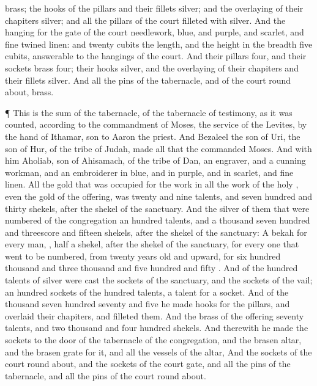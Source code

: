 {brass; the
hooks of the
pillars and their
fillets
{}
silver; and the
overlaying of their
chapiters
{}
silver; and all the
pillars of the
court
{}
filleted with
silver.
And the
hanging for the
gate of the
court
{}
needlework,
{}
blue, and
purple, and
scarlet, and fine
twined
linen: and
twenty
cubits
{} the
length, and the
height in the
breadth
{}
five
cubits,
answerable to the
hangings of the
court.
And their
pillars
{}
four, and their
sockets
{}
brass
four; their
hooks
{}
silver, and the
overlaying of their
chapiters and their
fillets
{}
silver.
And all the
pins of the
tabernacle, and of the
court round
about,
{}
brass.
\par }{\PP {}¶
This is the
sum of the
tabernacle,
{} of the
tabernacle of
testimony, as it was
counted, according to the
commandment of
Moses,
{} the
service of the
Levites, by the
hand of
Ithamar,
son to
Aaron the
priest.
And
Bezaleel the
son of
Uri, the
son of
Hur, of the
tribe of
Judah,
made all that the
{}
commanded
Moses.
And with him
{}
Aholiab,
son of
Ahisamach, of the
tribe of
Dan, an
engraver, and a cunning
workman, and an
embroiderer in
blue, and in
purple, and in
scarlet, and fine
linen.
All the
gold that was
occupied for the
work in all the
work of the
holy
{}, even the
gold of the
offering, was
twenty and
nine
talents, and
seven
hundred and
thirty
shekels, after the
shekel of the
sanctuary.
And the
silver of them that were
numbered of the
congregation
{} an
hundred
talents, and a
thousand
seven
hundred and threescore and
fifteen
shekels, after the
shekel of the
sanctuary:
A
bekah for every
man,
{},
half a
shekel, after the
shekel of the
sanctuary, for every one that
went to be
numbered, from
twenty
years
old and
upward, for
six
hundred
thousand and
three
thousand and
five
hundred and
fifty
{}.
And of the
hundred
talents of
silver were
cast the
sockets of the
sanctuary, and the
sockets of the
vail; an
hundred
sockets of the
hundred
talents, a
talent for a
socket.
And of the
thousand
seven
hundred
seventy and
five
{} he
made
hooks for the
pillars, and
overlaid their
chapiters, and
filleted them.
And the
brass of the
offering
{}
seventy
talents, and two
thousand and
four
hundred
shekels.
And therewith he
made the
sockets to the
door of the
tabernacle of the
congregation, and the
brasen
altar, and the
brasen
grate for it, and all the
vessels of the
altar,
And the
sockets of the
court round
about, and the
sockets of the
court
gate, and all the
pins of the
tabernacle, and all the
pins of the
court round
about.

}
